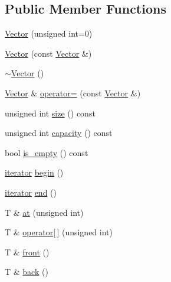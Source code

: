 \subsection*{Public Member Functions}
\begin{DoxyCompactItemize}
\item 
\hyperlink{classVector_aed1b9a621d7d2fc968e6e113fcda3f9a_aed1b9a621d7d2fc968e6e113fcda3f9a}{Vector} (unsigned int=0)
\item 
\hyperlink{classVector_a4edc1cac2c4cd6d3791280edabd89029_a4edc1cac2c4cd6d3791280edabd89029}{Vector} (const \hyperlink{classVector}{Vector} \&)
\item 
\hyperlink{classVector_afd524fac19e6d3d69db5198ffe2952b0_afd524fac19e6d3d69db5198ffe2952b0}{$\sim$\+Vector} ()
\item 
\hyperlink{classVector}{Vector} \& \hyperlink{classVector_a8d6906176604f2201919991acf655d13_a8d6906176604f2201919991acf655d13}{operator=} (const \hyperlink{classVector}{Vector} \&)
\item 
unsigned int \hyperlink{classVector_a5214a382564aedc712b609416aa3b7b1_a5214a382564aedc712b609416aa3b7b1}{size} () const
\item 
unsigned int \hyperlink{classVector_a68ecb8dc5e1047cead715396d146ed61_a68ecb8dc5e1047cead715396d146ed61}{capacity} () const
\item 
bool \hyperlink{classVector_a03a683aee83b3e9e0369a9e431a9259b_a03a683aee83b3e9e0369a9e431a9259b}{is\+\_\+empty} () const
\item 
\hyperlink{classVector_1_1iterator}{iterator} \hyperlink{classVector_ad1dc835efbf1859b3bd960c9b4f55ad4_ad1dc835efbf1859b3bd960c9b4f55ad4}{begin} ()
\item 
\hyperlink{classVector_1_1iterator}{iterator} \hyperlink{classVector_ac03563dbb2d417a36096b524a4875674_ac03563dbb2d417a36096b524a4875674}{end} ()
\item 
T \& \hyperlink{classVector_a3ae75814fa1b993c0abfd82aa513b5b3_a3ae75814fa1b993c0abfd82aa513b5b3}{at} (unsigned int)
\item 
T \& \hyperlink{classVector_a8b133b35c069989a02ed3db7e78cae02_a8b133b35c069989a02ed3db7e78cae02}{operator\mbox{[}$\,$\mbox{]}} (unsigned int)
\item 
T \& \hyperlink{classVector_a0061cc9127a9cbf541439121998a1fdd_a0061cc9127a9cbf541439121998a1fdd}{front} ()
\item 
T \& \hyperlink{classVector_a6decf0bdeb6849bfcc151b2c514f639f_a6decf0bdeb6849bfcc151b2c514f639f}{back} ()
\item 

\end{DoxyCompactItemize}
